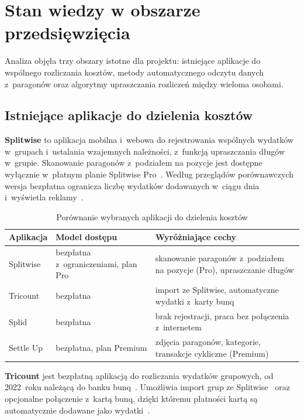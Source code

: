 \section{Stan wiedzy w obszarze przedsięwzięcia}

Analiza objęła trzy obszary istotne dla projektu: istniejące aplikacje do wspólnego rozliczania kosztów, metody automatycznego odczytu danych z~paragonów oraz algorytmy upraszczania rozliczeń między wieloma osobami.

\subsection{Istniejące aplikacje do dzielenia kosztów}

\textbf{Splitwise} to aplikacja mobilna i~webowa do rejestrowania wspólnych wydatków w~grupach i~ustalania wzajemnych należności, z~funkcją upraszczania długów w~grupie. Skanowanie paragonów z~podziałem na pozycje jest dostępne wyłącznie w~płatnym planie Splitwise Pro~\cite{splitwise-appstore}. Według przeglądów porównawczych wersja bezpłatna ogranicza liczbę wydatków dodawanych w~ciągu dnia i~wyświetla reklamy~\cite{finny-alternatives}.

\begin{table}[H]
  \centering
  \caption{Porównanie wybranych aplikacji do dzielenia kosztów}
  \label{tab:porownanie-aplikacji}
  \begin{tabularx}{\textwidth}{@{}lL L@{}}
    \toprule
    Aplikacja & Model dostępu & Wyróżniające cechy \\
    \midrule
    Splitwise & bezpłatna z~ograniczeniami, plan Pro & skanowanie paragonów z~podziałem na pozycje (Pro), upraszczanie długów \\
    Tricount & bezpłatna & import ze Splitwise, automatyczne wydatki z~karty bunq \\
    Splid & bezpłatna & brak rejestracji, praca bez połączenia z~internetem \\
    Settle Up & bezpłatna, plan Premium & zdjęcia paragonów, kategorie, transakcje cykliczne (Premium) \\
    \bottomrule
  \end{tabularx}
\end{table}

\textbf{Tricount} jest bezpłatną aplikacją do rozliczania wydatków grupowych, od 2022~roku należącą do banku bunq~\cite{techcrunch-tricount}. Umożliwia import grup ze Splitwise~\cite{tricount-splitwise} oraz opcjonalne połączenie z~kartą bunq, dzięki któremu płatności kartą są automatycznie dodawane jako wydatki~\cite{tricount-features}.

